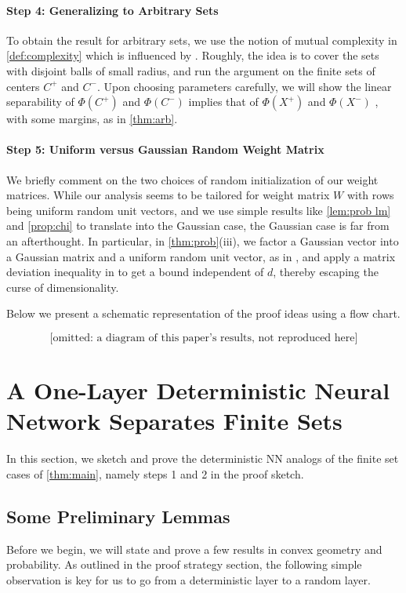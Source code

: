 \documentclass[aoap]{imsart}
\numberwithin{equation}{section}
\theoremstyle{definition}
\theoremstyle{remark}
\numberwithin{equation}{section}
\newcommand{\0}{\mathbf{0}}
\newcommand{\1}{\mathbf{1}}
\numberwithin{equation}{section}
\begin{document}
\paragraph{Step 4: Generalizing to Arbitrary Sets}
To obtain the result for arbitrary sets, we use the notion of mutual complexity in \cref{def:complexity} which is influenced by \cite{dirksen2021separation}. Roughly, the idea is to cover the sets with disjoint balls of small radius, and run the argument on the finite sets of centers $C^+$ and $C^-$. Upon choosing parameters carefully, we will show the linear separability of $\Phi(C^+)$ and $\Phi(C^-)$ implies that of $\Phi(X^+)$ and $\Phi(X^-)$ , with some margins, as in \cref{thm:arb}.

\paragraph{Step 5: Uniform versus Gaussian Random Weight Matrix} We briefly comment on the two choices of random initialization of our weight matrices. While our analysis seems to be tailored for weight matrix $W$ with rows being uniform random unit vectors, and we use simple results like \cref{lem:prob lm} and \cref{prop:chi} to translate into the Gaussian case, the Gaussian case is far from an afterthought. In particular, in \cref{thm:prob}(iii), we factor a Gaussian vector into a Gaussian matrix and a uniform random unit vector, as in \cite[Proof of Theorem 1.6]{dirksen2021separation}, and apply a matrix deviation inequality in \cite[Exercise 9.1.8]{Ver18} to get a bound independent of $d$, thereby escaping the curse of dimensionality.


Below we present a schematic representation of the proof ideas using a flow chart.

\[\mbox{[omitted: a diagram of this paper's results, not reproduced here]}\]

\section{A One-Layer Deterministic Neural Network Separates Finite Sets}\label{sec:One}
In this section, we sketch and prove the deterministic NN analogs of the finite set cases of \cref{thm:main}, namely steps 1 and 2 in the proof sketch.

\subsection{Some Preliminary Lemmas}\label{sec:prelim}
Before we begin, we will state and prove a few results in convex geometry and probability. As outlined in the proof strategy section, the following simple observation is key for us to go from a deterministic layer to a random layer.
\end{document}
